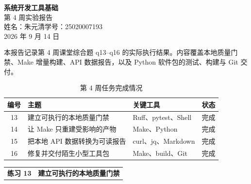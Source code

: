 \documentclass[UTF8,zihao=-4]{ctexart}
\newcommand{\exercisebanner}[3]{\begin{tcolorbox}[colback=soft,colframe=navy,boxrule=1pt,arc=2mm,left=4mm,right=4mm,top=2.5mm,bottom=2.5mm]\begin{tabularx}{\textwidth}{>{\Large\bfseries\color{navy}}p{2.7cm}X}练习 #1 & {\large\bfseries\color{navy}#2}\quad{\normalsize（#3）}\end{tabularx}\end{tcolorbox}}
\begin{document}
\vspace*{.7cm}\begin{center}
{\fontsize{28}{34}\selectfont\bfseries 系统开发工具基础}\\[.35cm]
{\fontsize{22}{28}\selectfont 第 4 周实验报告}\\[1cm]
{\Large 姓名：朱元清\qquad 学号：25020007193}\\[.6cm]
{\Large 2026 年 9 月 14 日}
\end{center}
\vspace{.7cm}
\begin{tcolorbox}[colback=soft,colframe=navy,boxrule=.8pt,arc=2mm,left=5mm,right=5mm,top=4mm,bottom=4mm]
\centering 本报告记录第 4 周课堂综合题 q13--q16 的实际执行结果。内容覆盖本地质量门禁、Make 增量构建、API 数据报告，以及 Python 软件包的测试、构建与 Git 交付。
\end{tcolorbox}
\vspace{.55cm}
\begin{table}[H]\centering\caption{第 4 周任务完成情况}\renewcommand{\arraystretch}{1.22}
\begin{tabularx}{.96\textwidth}{cX>{\raggedright\arraybackslash}p{4.1cm}c}\toprule
编号&主题&关键工具&状态\\\midrule
13&建立可执行的本地质量门禁&Ruff、pytest、Shell&完成\\
14&让 Make 只重建受影响的产物&Make、Python&完成\\
15&把本地 API 数据转换为可读报告&curl、jq、Markdown&完成\\
16&修复并交付陌生小型工具包&Make、build、Git&完成\\
\bottomrule
\end{tabularx}\end{table}
\clearpage\exercisebanner{13}{建立可执行的本地质量门禁}{Ruff、pytest 与 Shell}
\end{document}
